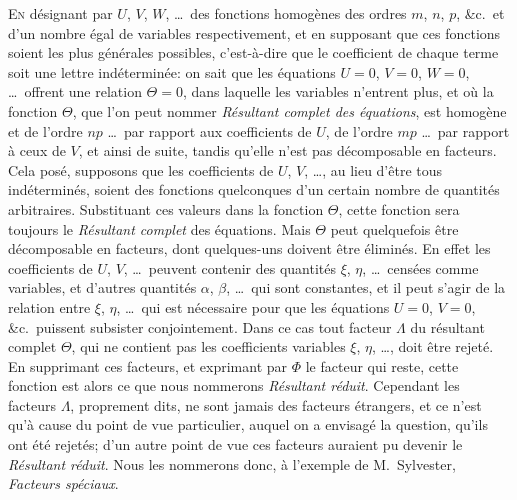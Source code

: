 \documentclass[12pt,a4paper]{article}
\theoremstyle{plain}
\begin{document}
\textsc{En} d\'esignant par $U$, $V$, $W$, \ldots\ des fonctions homog\`enes des ordres $m$, $n$, $p$, \&c.\ et d'un nombre \'egal de variables respectivement, et en supposant que ces fonctions soient les plus g\'en\'erales possibles, c'est-\`a-dire que le coefficient de chaque terme soit une lettre ind\'etermin\'ee: on sait que les \'equations $U = 0$, $V = 0$, $W = 0$, \ldots\ offrent une relation $\Theta = 0$, dans laquelle les variables n'entrent plus, et o\`u la fonction $\Theta$, que l'on peut nommer \textit{R\'esultant complet des \'equations}, est homog\`ene et de l'ordre $np$ \ldots\ par rapport aux coefficients de $U$, de l'ordre $mp$ \ldots\ par rapport \`a ceux de $V$, et ainsi de suite, tandis qu'elle n'est pas d\'ecomposable en facteurs. Cela pos\'e, supposons que les coefficients de $U$, $V$, \ldots, au lieu d'\^etre tous ind\'etermin\'es, soient des fonctions quelconques d'un certain nombre de quantit\'es arbitraires. Substituant ces valeurs dans la fonction $\Theta$, cette fonction sera toujours le \textit{R\'esultant complet} des \'equations. Mais $\Theta$ peut quelquefois \^etre d\'ecomposable en facteurs, dont quelques-uns doivent \^etre \'elimin\'es. En effet les coefficients de $U$, $V$, \ldots\ peuvent contenir des quantit\'es $\xi$, $\eta$, \ldots\ cens\'ees comme variables, et d'autres quantit\'es $\alpha$, $\beta$, \ldots\ qui sont constantes, et il peut s'agir de la relation entre $\xi$, $\eta$, \ldots\ qui est n\'ecessaire pour que les \'equations $U = 0$, $V = 0$, \&c.\ puissent subsister conjointement. Dans ce cas tout facteur $\Lambda$ du r\'esultant complet $\Theta$, qui ne contient pas les coefficients variables $\xi$, $\eta$, \ldots, doit \^etre rejet\'e. En supprimant ces facteurs, et exprimant par $\Phi$ le facteur qui reste, cette fonction est alors ce que nous nommerons \textit{R\'esultant r\'eduit}. Cependant les facteurs $\Lambda$, proprement dits, ne sont jamais des facteurs \'etrangers, et ce n'est qu'\`a cause du point de vue particulier, auquel on a envisag\'e la question, qu'ils ont \'et\'e rejet\'es; d'un autre point de vue ces facteurs auraient pu devenir le \textit{R\'esultant r\'eduit}. Nous les nommerons donc, \`a l'exemple de M.~Sylvester, \textit{Facteurs sp\'eciaux}.
\end{document}
